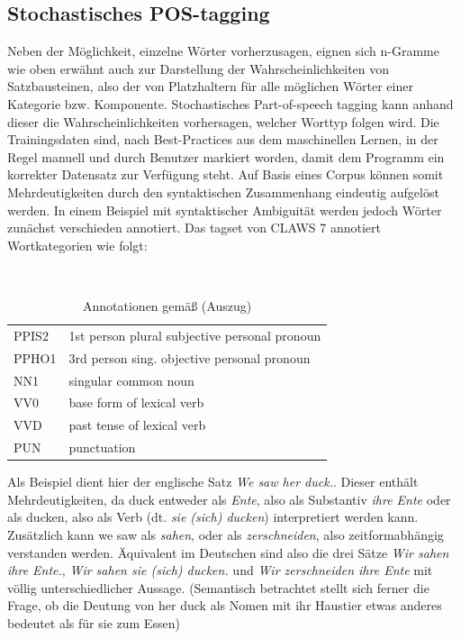\documentclass[12pt]{report}
\begin{document}
\subsection{Stochastisches POS-tagging}
Neben der Möglichkeit, einzelne Wörter vorherzusagen, eignen sich n-Gramme wie oben erwähnt auch zur Darstellung der Wahrscheinlichkeiten von Satzbausteinen, also der von Platzhaltern für alle möglichen Wörter einer Kategorie bzw. Komponente. Stochastisches Part-of-speech tagging kann anhand dieser die Wahrscheinlichkeiten vorhersagen, welcher Worttyp folgen wird. Die Trainingsdaten sind, nach Best-Practices aus dem maschinellen Lernen, in der Regel manuell und durch Benutzer markiert worden, damit dem Programm ein korrekter Datensatz zur Verfügung steht. Auf Basis eines Corpus können somit Mehrdeutigkeiten durch den syntaktischen Zusammenhang eindeutig aufgelöst werden. In einem Beispiel mit syntaktischer Ambiguität werden jedoch Wörter zunächst verschieden annotiert.
Das tagset von CLAWS 7 annotiert Wortkategorien wie folgt:

\begin{table}[h]
\tt
\begin{tabular}{ll}
PPIS2	& 1st person plural subjective personal pronoun \\
PPHO1	& 3rd person sing. objective personal pronoun\\
NN1		& singular common noun \\
VV0		& base form of lexical verb \\
VVD		& past tense of lexical verb \\
PUN		& punctuation
\end{tabular}
\caption{Annotationen gemäß \cite{clw7} (Auszug)}
\end{table} 

\rm

Als Beispiel dient hier der englische Satz \textit{\glqq  We saw her duck.\grqq{}}. Dieser enthält Mehrdeutigkeiten, da \glqq  duck\grqq{} entweder als \textit{\glqq  Ente\grqq{}}, also als Substantiv \textit{\glqq  ihre Ente\grqq{}} oder als \glqq  ducken\grqq{}, also als Verb (dt. \textit{\glqq  sie (sich) ducken\grqq{}}) interpretiert werden kann. Zusätzlich kann \glqq  we saw\grqq{} als \textit{\glqq  sahen\grqq{}}, oder als \textit{\glqq  zerschneiden\grqq{}}, also zeitformabhängig verstanden werden. Äquivalent im Deutschen sind also die drei Sätze \textit{\glqq  Wir sahen ihre Ente.\grqq{}}, \textit{\glqq  Wir sahen sie (sich) ducken.\grqq{}} und \textit{\glqq  Wir zerschneiden ihre Ente\grqq{}} mit völlig unterschiedlicher Aussage. (Semantisch betrachtet stellt sich ferner die Frage, ob die Deutung von \glqq  her duck\grqq{} als Nomen mit \glqq  ihr Haustier\grqq{} etwas anderes bedeutet als \glqq  für sie zum Essen\grqq{})
\end{document}
